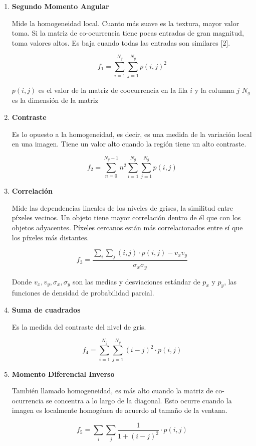 \begin{enumerate}

\item \textbf{Segundo Momento Angular}

Mide la homogeneidad local. Cuanto más suave es la textura, mayor valor toma. Si la matriz de co-ocurrencia tiene pocas entradas de gran magnitud, toma valores altos. Es baja cuando todas las entradas son similares [2].

\[f_1 = \sum_{i=1}^{N_g}\sum_{j=1}^{N_g} p(i,j)^2\]

$p(i,j)$ es el valor de la matriz de coocurrencia en la fila $i$ y la columna $j$
$N_g$ es la dimensión de la matriz

\item \textbf{Contraste}

Es lo opuesto a la homogeneidad, es decir, es una medida de la variación local en una imagen. Tiene un valor alto cuando la región tiene un alto contraste.

\[f_2 =\sum_{n=0}^{N_g-1}n^2 \sum_{i=1}^{N_g}\sum_{j=1}^{N_g} p(i,j)\]

\item \textbf{Correlación}

Mide las dependencias lineales de los niveles de grises, la similitud entre píxeles vecinos. Un objeto tiene mayor correlación dentro de él que con los objetos adyacentes. Píxeles cercanos están más correlacionados entre sí que los píxeles más distantes.

\[f_3 = \frac{\sum_i \sum_j (i,j)\cdot p(i,j) - v_xv_y}{\sigma_x\sigma_y}\]

Donde $v_x, v_y, \sigma_x, \sigma_y$ son las medias y desviaciones estándar de $p_x$ y $p_y$, las funciones de densidad de probabilidad parcial.

\item \textbf{Suma de cuadrados}

Es la medida del contraste del nivel de gris.

\[f_4 = \sum_{i=1}^{N_g}\sum_{j=1}^{N_g}(i-j)^2\cdot p(i,j)\]

\item \textbf{Momento Diferencial Inverso}

También llamado homogeneidad, es más alto cuando la matriz de co-ocurrencia se concentra a lo largo de la diagonal. Esto ocurre cuando la imagen es localmente homogénea de acuerdo al tamaño de la ventana.

\[f_5 = \sum_{i}\sum_{j}\frac{1}{1+(i-j)^2}\cdot p(i,j)\]


\end{enumerate}
